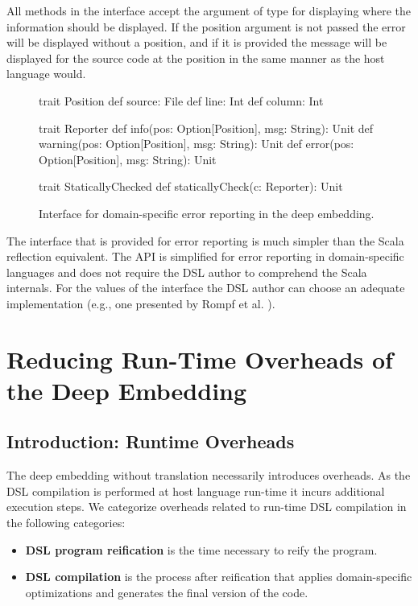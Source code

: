All methods in the  interface accept the  argument of type 
 for displaying where the information should be displayed. If the position argument
 is not passed the error will be displayed without a position, and if it is provided the
 message will be displayed for the source code at the position in the same manner
 as the host language would.

\begin{figure}
\begin{listingtiny}
trait Position {
  def source: File
  def line: Int
  def column: Int
}

trait Reporter {
  def info(pos: Option[Position], msg: String): Unit
  def warning(pos: Option[Position], msg: String): Unit
  def error(pos: Option[Position], msg: String): Unit
}

trait StaticallyChecked {
  def staticallyCheck(c: Reporter): Unit
}
\end{listingtiny}
\caption{Interface for domain-specific error reporting in the deep embedding.}
\label{fig:statically-checked}
\end{figure}

The interface that is provided for error reporting is much simpler than the Scala reflection equivalent. The API
is simplified for error reporting in domain-specific languages and does not require the
DSL author to comprehend the Scala internals. For the values of the  interface
the DSL author can choose an adequate implementation (e.g., one presented by Rompf et al. \cite{rompf_scala-virtualized:_2009}).




\chapter{Reducing Run-Time Overheads of the Deep Embedding}
\label{sec:reducing-runtime-overheads}

\section{Introduction: Runtime Overheads}
\label{sec:runtime-overheads-deep}

The deep embedding without translation necessarily introduces overheads. As the
DSL compilation is performed at host language run-time it incurs additional execution steps. We categorize overheads
related to run-time DSL compilation in the following categories:\begin{itemize}
 \item {\bf DSL program reification} is the time necessary to reify the program.
 \item {\bf DSL compilation} is the process after reification that applies domain-specific optimizations and
   generates the final version of the code.
\end{itemize}

